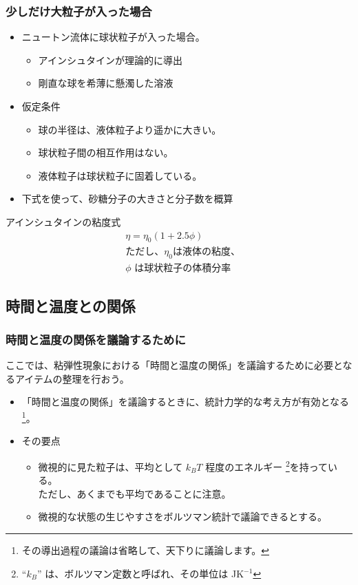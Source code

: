\documentclass[12pt, dvipdfmx]{beamer}
\begin{document}
\begin{frame}
    \frametitle{少しだけ大粒子が入った場合}
		\begin{itemize}
			\item ニュートン流体に球状粒子が入った場合。
				\begin{itemize}
					\item アインシュタインが理論的に導出
					\item 剛直な球を希薄に懸濁した溶液
				\end{itemize}
			\item 仮定条件
				\begin{itemize}
					\item 球の半径は、液体粒子より遥かに大きい。
					\item 球状粒子間の相互作用はない。
					\item 液体粒子は球状粒子に固着している。
				\end{itemize}
			\item 下式を使って、砂糖分子の大きさと分子数を概算
		\end{itemize}
		\begin{block}{アインシュタインの粘度式}
			\vspace{-5mm}
			\begin{align*}
				&\eta = \eta_0(1+2.5\phi) \\
				&\text{ただし、$\eta_0$は液体の粘度、} \\
				&\text{$\phi$ は球状粒子の体積分率}
			\end{align*}
		\end{block}
\end{frame}

\subsection{時間と温度との関係}
\begin{frame}
	\frametitle{時間と温度の関係を議論するために}
		ここでは、粘弾性現象における「時間と温度の関係」を議論するために必要となるアイテムの整理を行おう。
		\begin{itemize}
			\item 「時間と温度の関係」を議論するときに、統計力学的な考え方が有効となる
			\footnote{
				その導出過程の議論は省略して、天下りに議論します。
			}。
			\item その要点
			\begin{itemize}
				\item 微視的に見た粒子は、平均として $k_BT$ 程度のエネルギー
				\footnote{
					``$k_B$'' は、ボルツマン定数と呼ばれ、その単位は JK$^{-1}$
				}を持っている。\\
			ただし、\alert{あくまでも平均であることに注意。}
				\item 微視的な状態の生じやすさをボルツマン統計で議論できるとする。
			\end{itemize}
		\end{itemize}
\end{frame}
\end{document}
